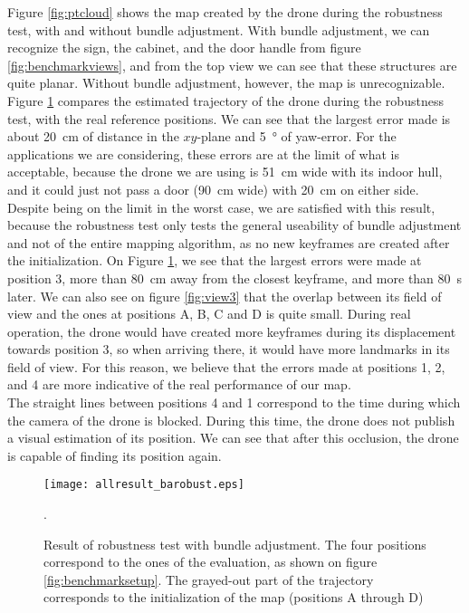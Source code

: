 Figure \ref{fig:ptcloud} shows the map created by the drone during the robustness test, with and without bundle adjustment. With bundle adjustment, we can recognize the sign, the cabinet, and the door handle from figure \ref{fig:benchmarkviews}, and from the top view we can see that these structures are quite planar. Without bundle adjustment, however, the map is unrecognizable.\\

Figure \ref{fig:xyyaw_traj} compares the estimated trajectory of the drone during the robustness test, with the real reference positions. We can see that the largest error made is about \SI{20}{\centi\meter} of distance in the $xy$-plane and \SI{5}{\degree} of yaw-error. For the applications we are considering, these errors are at the limit of what is acceptable, because the drone we are using is \SI{51}{\centi\meter} wide with its indoor hull, and it could just not pass a door (\SI{90}{\centi\meter} wide) with \SI{20}{\centi\meter} on either side. \\

Despite being on the limit in the worst case, we are satisfied with this result, because the robustness test only tests the general useability of bundle adjustment and not of the entire mapping algorithm, as no new keyframes are created after the initialization. On Figure \ref{fig:xyyaw_traj}, we see that the largest errors were made at position 3, more than \SI{80}{\centi\meter} away from the closest keyframe, and more than \SI{80}{\second} later. We can also see on figure \ref{fig:view3} that the overlap between its field of view and the ones at positions A, B, C and D is quite small. During real operation, the drone would have created more keyframes during its displacement towards position 3, so when arriving there, it would have more landmarks in its field of view. For this reason, we believe that the errors made at positions 1, 2, and 4 are more indicative of the real performance of our map.\\

The straight lines between positions 4 and 1 correspond to the time during which the camera of the drone is blocked. During this time, the drone does not publish a visual estimation of its position. We can see that after this occlusion, the drone is capable of finding its position again.

\begin{figure}[H]
  \centering
  \texttt{[image: allresult\_barobust.eps]}
\caption{Result of robustness test with bundle adjustment. The four positions correspond to the ones of the evaluation, as shown on figure \ref{fig:benchmarksetup}. The grayed-out part of the trajectory corresponds to the initialization of the map (positions A through D)}.
\label{fig:xyyaw_traj}
\end{figure}

